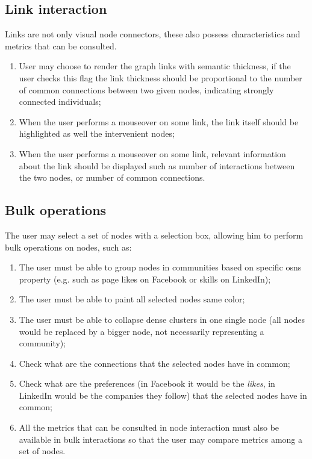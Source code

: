 \subsection{Link interaction}

Links are not only visual node connectors, these also possess characteristics and metrics that can be consulted.

\begin{enumerate}
    \item User may choose to render the graph links with semantic thickness, if the user checks this flag the link thickness should be
    proportional to the number of common connections between two given nodes, indicating strongly connected individuals;
    \item When the user performs a mouseover on some link, the link itself should be highlighted as well the intervenient nodes;
    \item When the user performs a mouseover on some link, relevant information about the link should be displayed such as number of interactions between the two nodes, or number of common connections.
\end{enumerate}

\subsection{Bulk operations}

The user may select a set of nodes with a selection box, allowing him to perform bulk operations on nodes, such as:

\begin{enumerate}
    \item The user must be able to group nodes in communities based on specific \glspl{osn} property (e.g. such as page likes on Facebook or skills on LinkedIn);
    \item The user must be able to paint all selected nodes same color;
    \item The user must be able to collapse dense clusters in one single node (all nodes would be replaced by a bigger node, not necessarily representing a community); %
    \item Check what are the connections that the selected nodes have in common;
    \item Check what are the preferences (in Facebook it would be the \textit{likes}, in LinkedIn would be the companies they follow) that the selected nodes have in common;
    \item All the metrics that can be consulted in node interaction must also be available in bulk interactions so that the user may compare metrics among a set of
    nodes.
\end{enumerate}


